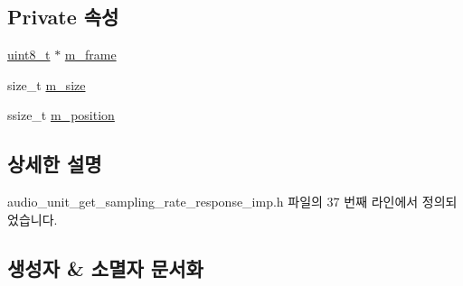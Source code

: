 \subsection*{Private 속성}
\begin{DoxyCompactItemize}
\item 
\hyperlink{stdint_8h_aba7bc1797add20fe3efdf37ced1182c5}{uint8\+\_\+t} $\ast$ \hyperlink{classavdecc__lib_1_1audio__unit__get__sampling__rate__response__imp_a50417969cf438e7c8d698726bbbe2ff9}{m\+\_\+frame}
\item 
size\+\_\+t \hyperlink{classavdecc__lib_1_1audio__unit__get__sampling__rate__response__imp_a0dc3c363255f193681c77b4d2a82e995}{m\+\_\+size}
\item 
ssize\+\_\+t \hyperlink{classavdecc__lib_1_1audio__unit__get__sampling__rate__response__imp_af5e691c4a8a0feb07f48440b321206cd}{m\+\_\+position}
\end{DoxyCompactItemize}


\subsection{상세한 설명}


audio\+\_\+unit\+\_\+get\+\_\+sampling\+\_\+rate\+\_\+response\+\_\+imp.\+h 파일의 37 번째 라인에서 정의되었습니다.



\subsection{생성자 \& 소멸자 문서화}
